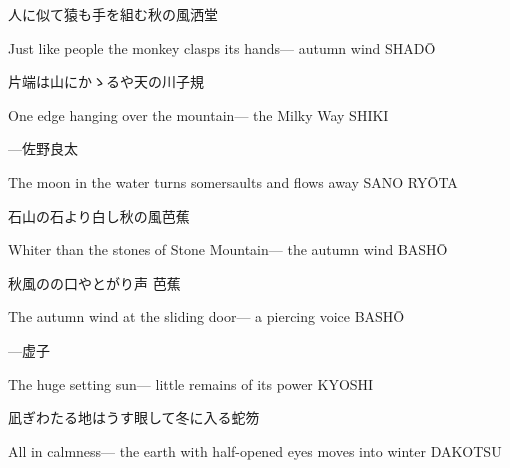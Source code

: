 \begin{haiku}
    {\FH 人に似て猿も手を組む秋の風}\hfill{\FH 洒堂}

    \vin{} Just like people
    \vin{} \vin{} the monkey clasps its hands---
    \vin{} \vin{} \vin{} autumn wind \hspace{\fill} SHAD\={O}
\end{haiku}

\begin{haiku}
    {\FH 片端は山にかゝるや天の川}\hfill{\FH 子規}

    \vin{} One edge
    \vin{} \vin{} hanging over the mountain---
    \vin{} \vin{} \vin{} the Milky Way \hspace{\fill} SHIKI
\end{haiku}

\begin{haiku}
    {---}\hfill{\FH 佐野良太}

    \vin{} The moon in the water
    \vin{} \vin{} turns somersaults
    \vin{} \vin{} \vin{} and flows away \hspace{\fill} SANO RY\={O}TA
\end{haiku}

\begin{haiku}
    {\FH 石山の石より白し秋の風}\hfill{\FH 芭蕉}

    \vin{} Whiter than
    \vin{} \vin{} the stones of Stone Mountain---
    \vin{} \vin{} \vin{} the autumn wind \hspace{\fill} BASH\={O}
\end{haiku}

\begin{haiku}
    {\FH 秋風のの口やとがり声 }\hfill{\FH 芭蕉}

    \vin{} The autumn wind
    \vin{} \vin{} at the sliding door---
    \vin{} \vin{} \vin{} a piercing voice \hspace{\fill} BASH\={O}
\end{haiku}

\begin{haiku}
    {---}\hfill{\FH 虚子}

    \vin{} The huge setting sun---
    \vin{} \vin{} little remains of
    \vin{} \vin{} \vin{} its power \hspace{\fill} KYOSHI
\end{haiku}

\begin{haiku}
    {\FH 凪ぎわたる地はうす眼して冬に入る}\hfill{\FH 蛇笏}

    \vin{} All in calmness---
    \vin{} \vin{} the earth with half-opened eyes
    \vin{} \vin{} \vin{} moves into winter \hspace{\fill} DAKOTSU
\end{haiku}

